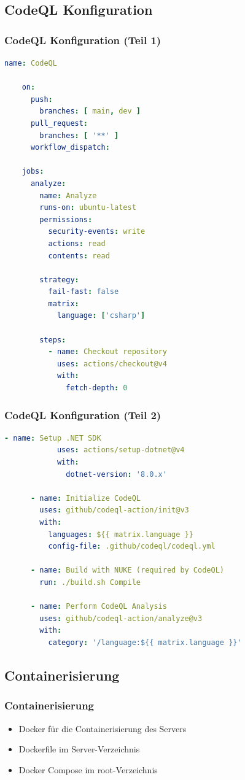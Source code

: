 \documentclass{beamer}
\begin{document}
\subsection{CodeQL Konfiguration}
\begin{frame}[fragile]
\frametitle{CodeQL Konfiguration (Teil 1)}
  \begin{lstlisting}[language=yaml, basicstyle=\ttfamily\tiny, breaklines=true]
    name: CodeQL

    on:
      push:
        branches: [ main, dev ]
      pull_request:
        branches: [ '**' ]
      workflow_dispatch:

    jobs:
      analyze:
        name: Analyze
        runs-on: ubuntu-latest
        permissions:
          security-events: write
          actions: read
          contents: read

        strategy:
          fail-fast: false
          matrix:
            language: ['csharp']

        steps:
          - name: Checkout repository
            uses: actions/checkout@v4
            with:
              fetch-depth: 0
  \end{lstlisting}
\end{frame}

\begin{frame}[fragile]
\frametitle{CodeQL Konfiguration (Teil 2)}
  \begin{lstlisting}[language=yaml, basicstyle=\ttfamily\tiny, breaklines=true]
      - name: Setup .NET SDK
            uses: actions/setup-dotnet@v4
            with:
              dotnet-version: '8.0.x'

      - name: Initialize CodeQL
        uses: github/codeql-action/init@v3
        with:
          languages: ${{ matrix.language }}
          config-file: .github/codeql/codeql.yml

      - name: Build with NUKE (required by CodeQL)
        run: ./build.sh Compile

      - name: Perform CodeQL Analysis
        uses: github/codeql-action/analyze@v3
        with:
          category: '/language:${{ matrix.language }}'
  \end{lstlisting}
\end{frame}

\subsection{Containerisierung}
\begin{frame}
\frametitle{Containerisierung}
  \begin{itemize}
    \item Docker für die Containerisierung des Servers
    \item Dockerfile im Server-Verzeichnis
    \item Docker Compose im root-Verzeichnis
  \end{itemize}
\end{frame}
\end{document}
